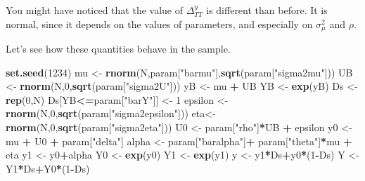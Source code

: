 \documentclass[]{book}
\newenvironment{Shaded}{\begin{snugshade}}{\end{snugshade}}
\newcommand{\KeywordTok}[1]{\textcolor[rgb]{0.13,0.29,0.53}{\textbf{#1}}}
\newcommand{\DecValTok}[1]{\textcolor[rgb]{0.00,0.00,0.81}{#1}}
\newcommand{\StringTok}[1]{\textcolor[rgb]{0.31,0.60,0.02}{#1}}
\newcommand{\OperatorTok}[1]{\textcolor[rgb]{0.81,0.36,0.00}{\textbf{#1}}}
\newcommand{\NormalTok}[1]{#1}
\theoremstyle{definition}
\theoremstyle{definition}
\theoremstyle{definition}
\theoremstyle{remark}
\let\BeginKnitrBlock\begin \let\EndKnitrBlock\end
\begin{document}
\BeginKnitrBlock{remark}
\iffalse{} {Remark. } \fi{}You might have noticed that the value of
\(\Delta^y_{TT}\) is different than before. It is normal, since it
depends on the values of parameters, and especially on
\(\sigma_{\mu}^2\) and \(\rho\).
\EndKnitrBlock{remark}

Let's see how these quantities behave in the sample.

\begin{Shaded}
\begin{Highlighting}[]
\KeywordTok{set.seed}\NormalTok{(}\DecValTok{1234}\NormalTok{)}
\NormalTok{mu <-}\StringTok{ }\KeywordTok{rnorm}\NormalTok{(N,param[}\StringTok{"barmu"}\NormalTok{],}\KeywordTok{sqrt}\NormalTok{(param[}\StringTok{"sigma2mu"}\NormalTok{]))}
\NormalTok{UB <-}\StringTok{ }\KeywordTok{rnorm}\NormalTok{(N,}\DecValTok{0}\NormalTok{,}\KeywordTok{sqrt}\NormalTok{(param[}\StringTok{"sigma2U"}\NormalTok{]))}
\NormalTok{yB <-}\StringTok{ }\NormalTok{mu }\OperatorTok{+}\StringTok{ }\NormalTok{UB }
\NormalTok{YB <-}\StringTok{ }\KeywordTok{exp}\NormalTok{(yB)}
\NormalTok{Ds <-}\StringTok{ }\KeywordTok{rep}\NormalTok{(}\DecValTok{0}\NormalTok{,N)}
\NormalTok{Ds[YB}\OperatorTok{<=}\NormalTok{param[}\StringTok{"barY"}\NormalTok{]] <-}\StringTok{ }\DecValTok{1} 
\NormalTok{epsilon <-}\StringTok{ }\KeywordTok{rnorm}\NormalTok{(N,}\DecValTok{0}\NormalTok{,}\KeywordTok{sqrt}\NormalTok{(param[}\StringTok{"sigma2epsilon"}\NormalTok{]))}
\NormalTok{eta<-}\StringTok{ }\KeywordTok{rnorm}\NormalTok{(N,}\DecValTok{0}\NormalTok{,}\KeywordTok{sqrt}\NormalTok{(param[}\StringTok{"sigma2eta"}\NormalTok{]))}
\NormalTok{U0 <-}\StringTok{ }\NormalTok{param[}\StringTok{"rho"}\NormalTok{]}\OperatorTok{*}\NormalTok{UB }\OperatorTok{+}\StringTok{ }\NormalTok{epsilon}
\NormalTok{y0 <-}\StringTok{ }\NormalTok{mu }\OperatorTok{+}\StringTok{  }\NormalTok{U0 }\OperatorTok{+}\StringTok{ }\NormalTok{param[}\StringTok{"delta"}\NormalTok{]}
\NormalTok{alpha <-}\StringTok{ }\NormalTok{param[}\StringTok{"baralpha"}\NormalTok{]}\OperatorTok{+}\StringTok{  }\NormalTok{param[}\StringTok{"theta"}\NormalTok{]}\OperatorTok{*}\NormalTok{mu }\OperatorTok{+}\StringTok{ }\NormalTok{eta}
\NormalTok{y1 <-}\StringTok{ }\NormalTok{y0}\OperatorTok{+}\NormalTok{alpha}
\NormalTok{Y0 <-}\StringTok{ }\KeywordTok{exp}\NormalTok{(y0)}
\NormalTok{Y1 <-}\StringTok{ }\KeywordTok{exp}\NormalTok{(y1)}
\NormalTok{y <-}\StringTok{ }\NormalTok{y1}\OperatorTok{*}\NormalTok{Ds}\OperatorTok{+}\NormalTok{y0}\OperatorTok{*}\NormalTok{(}\DecValTok{1}\OperatorTok{-}\NormalTok{Ds)}
\NormalTok{Y <-}\StringTok{ }\NormalTok{Y1}\OperatorTok{*}\NormalTok{Ds}\OperatorTok{+}\NormalTok{Y0}\OperatorTok{*}\NormalTok{(}\DecValTok{1}\OperatorTok{-}\NormalTok{Ds)}
\end{Highlighting}
\end{Shaded}
\end{document}
